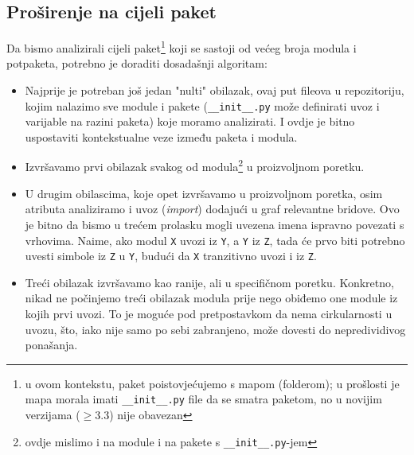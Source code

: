 \subsection{Proširenje na cijeli paket}
Da bismo analizirali cijeli paket\footnote{u ovom kontekstu, paket poistovjećujemo s
mapom (folderom); u prošlosti je mapa
morala imati \texttt{__init__.py} file da se smatra paketom, no u novijim verzijama
($\ge$3.3) nije obavezan}
koji se sastoji od većeg broja modula i potpaketa, potrebno je doraditi dosadašnji algoritam:
\begin{itemize}
\item Najprije je potreban još jedan "nulti" obilazak, ovaj put fileova u repozitoriju, kojim
nalazimo sve module i pakete (\texttt{__init__.py} može definirati uvoz i varijable na razini paketa)
koje moramo analizirati. I ovdje je bitno uspostaviti kontekstualne veze između paketa i modula.

\item Izvršavamo prvi obilazak svakog od modula\footnote{ovdje mislimo i na module i na pakete s
\texttt{__init__.py}-jem}
u proizvoljnom poretku.

\item U drugim obilascima, koje opet izvršavamo u proizvoljnom poretka, osim atributa analiziramo i
uvoz (\emph{import}) dodajući u graf relevantne bridove.
Ovo je bitno da bismo u trećem prolasku mogli uvezena imena ispravno povezati s vrhovima. Naime,
ako modul \texttt{X} uvozi iz \texttt{Y}, a \texttt{Y} iz \texttt{Z}, tada će prvo biti potrebno
uvesti simbole iz \texttt{Z} u \texttt{Y}, budući da \texttt{X} tranzitivno
uvozi i iz \texttt{Z}.

\item Treći obilazak izvršavamo kao ranije, ali u specifičnom poretku. Konkretno, nikad
ne počinjemo treći obilazak modula prije nego obiđemo one module iz kojih prvi uvozi.
To je moguće pod pretpostavkom da nema cirkularnosti u uvozu, što, iako nije
samo po sebi zabranjeno, može dovesti do nepredividivog ponašanja.

\end{itemize}


